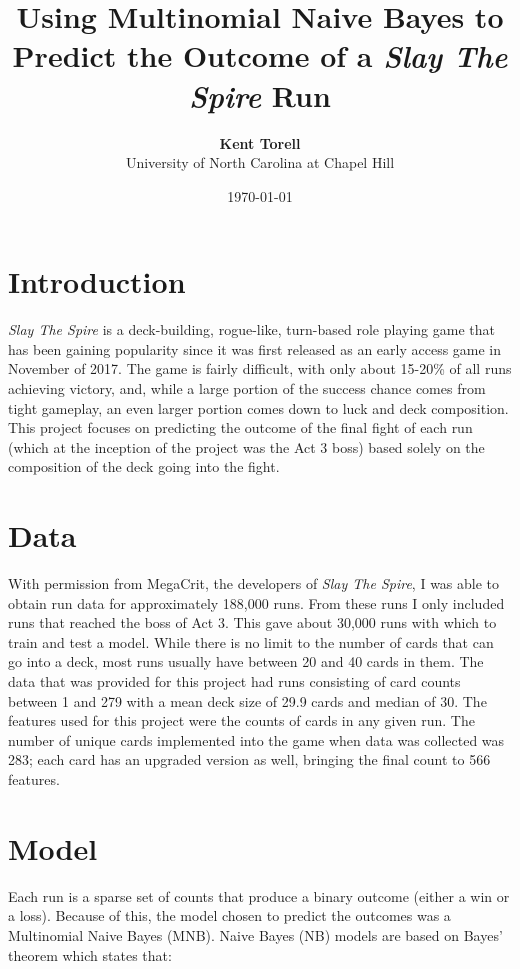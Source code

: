\documentclass[10pt, a4paper, twocolumn]{article}
\title{\textbf{Using Multinomial Naive Bayes to Predict the Outcome of a \textit{Slay The Spire} Run}}
\author{\textbf{Kent Torell} \\ University of North Carolina at Chapel Hill}
\date{\today}
\begin{document}
\maketitle

\section{Introduction}

\textit{Slay The Spire} is a deck-building, rogue-like, turn-based role playing game that has been gaining popularity since it was first released as an early access game in November of 2017.  The game is fairly difficult, with only about 15-20\% of all runs achieving victory, and, while a large portion of the success chance comes from tight gameplay, an even larger portion comes down to luck and deck composition.  This project focuses on predicting the outcome of the final fight of each run (which at the inception of the project was the Act 3 boss) based solely on the composition of the deck going into the fight.

\section{Data}
	With permission from MegaCrit, the developers of \textit{Slay The Spire}, I was able to obtain run data for approximately 188,000 runs.  From these runs I only included runs that reached the boss of Act 3.  This gave about 30,000 runs with which to train and test a model.
	While there is no limit to the number of cards that can go into a deck, most runs usually have between 20 and 40 cards in them.  The data that was provided for this project had runs consisting of card counts between 1 and 279 with a mean deck size of 29.9 cards and median of 30.  The features used for this project were the counts of cards in any given run.  The number of unique cards implemented into the game when data was collected was 283; each card has an upgraded version as well, bringing the final count to 566 features.

\section{Model}
Each run is a sparse set of counts that produce a binary outcome (either a win or a loss).  Because of this, the model chosen to predict the outcomes was a Multinomial Naive Bayes (MNB).  Naive Bayes (NB) models are based on Bayes’ theorem which states that:\\
\end{document}
